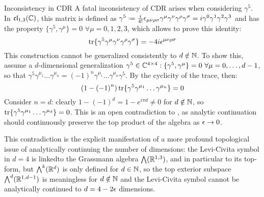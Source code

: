 \begin{observation}{Inconsistency in CDR}{}
  A fatal inconsistency of CDR arises when considering $ \gamma^5 $. In $ \mathfrak{cl}_{1,3}(\mathbb{C}) $, this matrix is defined as $ \gamma^5 \defeq \frac{i}{4!} \epsilon_{\mu \nu \rho \sigma} \gamma^\mu \gamma^\nu \gamma^\rho \gamma^\sigma = i \gamma^0 \gamma^1 \gamma^2 \gamma^3 $ and has the property $ \{\gamma^5 , \gamma^\mu\} = 0 \,\, \forall \mu = 0,1,2,3 $, which allows to prove this identity:
  \begin{equation}
    \operatorname{tr}\{\gamma^5 \gamma^\mu \gamma^\nu \gamma^\rho \gamma^\sigma\} = -4 i \epsilon^{\mu \nu \rho \sigma}
    \label{eq:top-form-gamma-5}
  \end{equation}
  This construction cannot be generalized consistently to $ d \notin \mathbb{N} $. To show this, assume a $ d $-dimensional generalization $ \gamma^5 \in \mathbb{C}^{4 \times 4} : \{\gamma^5 , \gamma^\mu\} = 0 \,\,\forall \mu = 0, \dots, d-1 $, so that $ \gamma^5 \gamma^{\mu_1} \dots \gamma^{\mu_n} = \left( -1 \right)^n \gamma^{\mu_1} \dots \gamma^{\mu_n} \gamma^5 $. By the cyclicity of the trace, then:
  \begin{equation}
    \left( 1 - \left( -1 \right)^n \right) \operatorname{tr}\{\gamma^5 \gamma^{\mu_1} \dots \gamma^{\mu_n}\} = 0
  \end{equation}
  Consider $ n = d $: clearly $ 1 - \left( -1 \right)^d = 1 - e^{i \pi d} \neq 0 $ for $ d \notin \mathbb{N} $, so $ \operatorname{tr}\{\gamma^5 \gamma^{\mu_1} \dots \gamma^{\mu_d}\} = 0 $. This is an open contradiction to , as analytic continuation should continuously preserve the top product of the algebra as $ \epsilon \rightarrow 0 $.

  This contradiction is the explicit manifestation of a more profound topological issue of analytically continuing the number of dimensions: the Levi-Civita symbol in $ d = 4 $ is linked\footnotemark to the Grassmann algebra $ \bigwedge(\mathbb{R}^{1,3}) $, and in particular to its top-form, but $ \bigwedge^k(\mathbb{R}^d) $ is only defined for $ d \in \mathbb{N} $, so the top exterior subspace $ \bigwedge^d(\mathbb{R}^{1,d-1}) $ is meaningless for $ d \notin \mathbb{N} $ and the Levi-Civita symbol cannot be analytically continued to $ d = 4 - 2 \epsilon $ dimensions.
\end{observation}

